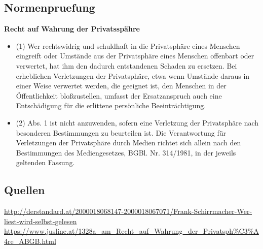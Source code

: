 	\subsection{Normenpruefung}
		\textbf{Recht auf Wahrung der Privatsspähre}
		\begin{itemize}
			\item (1) Wer rechtswidrig und schuldhaft in die Privatsphäre eines Menschen eingreift oder Umstände aus der Privatsphäre eines Menschen offenbart oder verwertet, hat ihm den dadurch entstandenen Schaden zu ersetzen. Bei erheblichen Verletzungen der Privatsphäre, etwa wenn Umstände daraus in einer Weise verwertet werden, die geeignet ist, den Menschen in der Öffentlichkeit bloßzustellen, umfasst der Ersatzanspruch auch eine Entschädigung für die erlittene persönliche Beeinträchtigung.
			\item (2) Abs. 1 ist nicht anzuwenden, sofern eine Verletzung der Privatsphäre nach besonderen Bestimmungen zu beurteilen ist. Die Verantwortung für Verletzungen der Privatsphäre durch Medien richtet sich allein nach den Bestimmungen des Mediengesetzes, BGBl. Nr. 314/1981, in der jeweils geltenden Fassung.
		\end{itemize}
	
	\subsection{Quellen}
	\url{http://derstandard.at/2000018068147-2000018067071/Frank-Schirrmacher-Wer-liest-wird-selbst-gelesen}
	\url{https://www.jusline.at/1328a_am_Recht_auf_Wahrung_der_Privatsph\%C3\%A4re_ABGB.html}
	